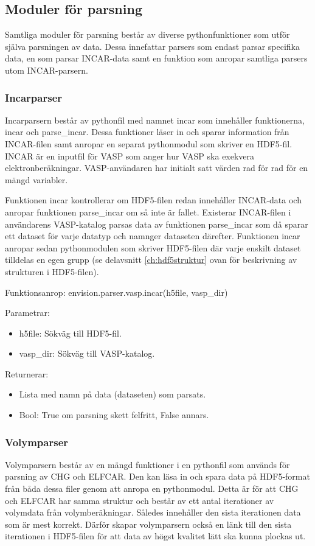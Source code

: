 \documentclass[a4paper,12pt]{article}
\begin{document}
\subsection{Moduler för parsning}
Samtliga moduler för parsning består av diverse pythonfunktioner som utför själva parsningen av data. Dessa innefattar parsers som endast parsar specifika data, en som parsar INCAR-data samt en funktion som anropar samtliga parsers utom INCAR-parsern.

\subsubsection{Incarparser}
Incarparsern består av pythonfil med namnet incar som innehåller funktionerna, incar och parse\_incar. Dessa funktioner läser in och sparar information från INCAR-filen samt anropar en separat pythonmodul som skriver en HDF5-fil. INCAR är en inputfil för VASP som anger hur VASP ska exekvera elektronberäkningar. VASP-användaren har initialt satt värden rad för rad för en mängd variabler.

Funktionen incar kontrollerar om HDF5-filen redan innehåller INCAR-data och anropar funktionen parse\_incar om så inte är fallet. Existerar INCAR-filen i användarens VASP-katalog parsas data av funktionen parse\_incar som då sparar ett dataset för varje datatyp och namnger dataseten därefter. Funktionen incar anropar sedan pythonmodulen som skriver HDF5-filen där varje enskilt dataset tilldelas en egen grupp (se delavsnitt \ref{ch:hdf5struktur} ovan för beskrivning av strukturen i HDF5-filen).

Funktionsanrop: envision.parser.vasp.incar(h5file, vasp\_dir)

Parametrar:
\begin{itemize}
\setlength\itemsep{0em}
\item h5file: Sökväg till HDF5-fil.
\item vasp\_dir: Sökväg till VASP-katalog.
\end{itemize}

Returnerar:
\begin{itemize}
\setlength\itemsep{0em}
\item Lista med namn på data (dataseten) som parsats.
\item Bool: True om parsning skett felfritt, False annars.
\end{itemize}

\subsubsection{Volymparser}
Volymparsern består av en mängd funktioner i en pythonfil som används för parsning av CHG och ELFCAR. Den kan läsa in och spara data på HDF5-format från båda dessa filer genom att anropa en pythonmodul. Detta är för att CHG och ELFCAR har samma struktur och består av ett antal iterationer av volymdata från volymberäkningar. Således innehåller den sista iterationen data som är mest korrekt. Därför skapar volymparsern också en länk till den sista iterationen i HDF5-filen för att data av högst kvalitet lätt ska kunna plockas ut.
\end{document}
